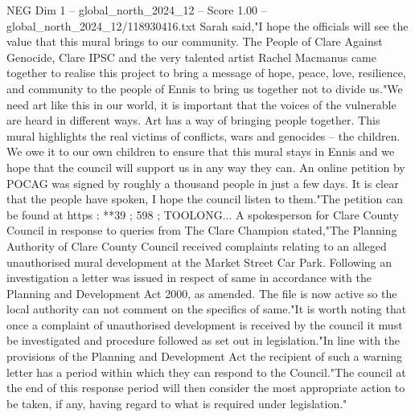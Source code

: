 \begin{textsample}{NEG Dim 1 – global\_north\_2024\_12 – Score 1.00 – global\_north\_2024\_12/118930416.txt}
Sarah said,"I hope the officials will see the value that this mural brings to our community.
The People of Clare Against Genocide, Clare IPSC and the very talented artist Rachel Macmanus came together to realise this project to bring a message of hope, peace, love, resilience, and community to the people of Ennis to bring us together not to divide us."We need art like this in our world, it is important that the voices of the vulnerable are heard in different ways.
Art has a way of bringing people together.
This mural highlights the real victims of conflicts, wars and genocides -- the children.
We owe it to our own children to ensure that this mural stays in Ennis and we hope that the council will support us in any way they can.
An online petition by POCAG was signed by roughly a thousand people in just a few days.
It is clear that the people have spoken, I hope the council listen to them."The petition can be found at https : **39 ; 598 ; TOOLONG...
A spokesperson for Clare County Council in response to queries from The Clare Champion stated,"The Planning Authority of Clare County Council received complaints relating to an alleged unauthorised mural development at the Market Street Car Park.
Following an investigation a letter was issued in respect of same in accordance with the Planning and Development Act 2000, as amended.
The file is now active so the local authority can not comment on the specifics of same."It is worth noting that once a complaint of unauthorised development is received by the council it must be investigated and procedure followed as set out in legislation."In line with the provisions of the Planning and Development Act the recipient of such a warning letter has a period within which they can respond to the Council."The council at the end of this response period will then consider the most appropriate action to be taken, if any, having regard to what is required under legislation."

\end{textsample}
